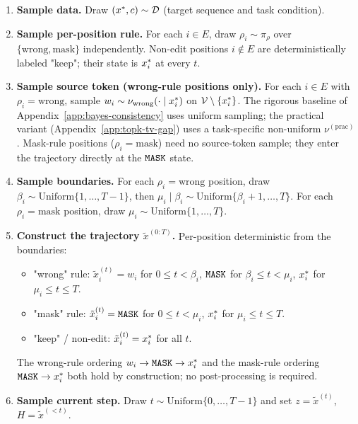 \begin{enumerate}
    \item \textbf{Sample data.} Draw $(x^{\ast}, c) \sim \mathcal{D}$ (target sequence and task condition).

    \item \textbf{Sample per-position rule.} For each $i \in E$, draw $\rho_i \sim \pi_\rho$ over $\{\mathrm{wrong}, \mathrm{mask}\}$ independently. Non-edit positions $i \notin E$ are deterministically labeled "keep"; their state is $x^{\ast}_i$ at every $t$.

    \item \textbf{Sample source token (wrong-rule positions only).} For each $i \in E$ with $\rho_i = \mathrm{wrong}$, sample $w_i \sim \nu_{\mathrm{wrong}}(\cdot \mid x^{\ast}_i)$ on $\mathcal{V} \setminus \{x^{\ast}_i\}$. The rigorous baseline of Appendix~\ref{app:bayes-consistency} uses uniform sampling; the practical variant (Appendix~\ref{app:topk-tv-gap}) uses a task-specific non-uniform $\nu^{(\mathrm{prac})}$. Mask-rule positions ($\rho_i = \mathrm{mask}$) need no source-token sample; they enter the trajectory directly at the $\texttt{MASK}$ state.

    \item \textbf{Sample boundaries.} For each $\rho_i = \mathrm{wrong}$ position, draw $\beta_i \sim \mathrm{Uniform}\{1, \ldots, T-1\}$, then $\mu_i \mid \beta_i \sim \mathrm{Uniform}\{\beta_i + 1, \ldots, T\}$. For each $\rho_i = \mathrm{mask}$ position, draw $\mu_i \sim \mathrm{Uniform}\{1, \ldots, T\}$.

    \item \textbf{Construct the trajectory $\tilde{x}^{(0:T)}$.} Per-position deterministic from the boundaries:
    \begin{itemize}
        \item "wrong" rule: $\tilde{x}^{(t)}_i = w_i$ for $0 \leq t < \beta_i$, $\texttt{MASK}$ for $\beta_i \leq t < \mu_i$, $x^{\ast}_i$ for $\mu_i \leq t \leq T$.
        \item "mask" rule: $\tilde{x}^{(t)}_i = \texttt{MASK}$ for $0 \leq t < \mu_i$, $x^{\ast}_i$ for $\mu_i \leq t \leq T$.
        \item "keep" / non-edit: $\tilde{x}^{(t)}_i = x^{\ast}_i$ for all $t$.
    \end{itemize}
    The wrong-rule ordering $w_i \to \texttt{MASK} \to x^{\ast}_i$ and the mask-rule ordering $\texttt{MASK} \to x^{\ast}_i$ both hold by construction; no post-processing is required.

    \item \textbf{Sample current step.} Draw $t \sim \mathrm{Uniform}\{0, \ldots, T-1\}$ and set $z = \tilde{x}^{(t)}$, $H = \tilde{x}^{(<t)}$.


\end{enumerate}
